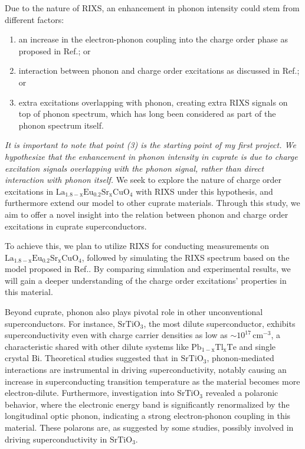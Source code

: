 \documentclass[11pt]{article}
\begin{document}
Due to the nature of RIXS, an enhancement in phonon intensity could stem from different factors: 
\begin{enumerate}
  \item an increase in the electron-phonon coupling into the charge order phase as proposed in Ref.\cite{wang_charge_2021,peng_electronic_2022}; or
  \item interaction between phonon and charge order excitations as discussed in Ref.\cite{li_multiorbital_2020, chaix_dispersive_2017,huang_quantum_2021}; or 
  \item extra excitations overlapping with phonon, creating extra RIXS signals on top of phonon spectrum, which has long been considered as part of the phonon spectrum itself. 
\end{enumerate}
\textit{It is important to note that point (3) is the starting point of my first project. We hypothesize that the enhancement in phonon intensity in cuprate is due to charge excitation signals overlapping with the phonon signal, rather than direct interaction with phonon itself.}  We seek to explore the nature of charge order excitations in $\mathrm{La_{1.8-x}Eu_{0.2}Sr_xCuO_{4}}$ with RIXS under this hypothesis, and furthermore extend our model to other cuprate materials. Through this study, we aim to offer a novel insight into the relation between phonon and charge order excitations in cuprate superconductors. 

To achieve this, we plan to utilize RIXS for conducting measurements on $\mathrm{La_{1.8-x}Eu_{0.2}Sr_xCuO_{4}}$, followed by simulating the RIXS spectrum based on the model proposed in Ref.\cite{devereaux_directly_2016}. By comparing simulation and experimental results, we will gain a deeper understanding of the charge order excitations' properties in this material. 

Beyond cuprate, phonon also plays pivotal role in other unconventional superconductors. For instance, $\mathrm{SrTiO_{3}}$, the most dilute superconductor, exhibits superconductivity even with charge carrier densities as low as $\sim 10^{17}\,\mathrm{cm^{-3}}$\cite{schooley_superconductivity_1964,lin_fermi_2013}, a characteristic shared with other dilute systems like $\mathrm{Pb_{1-x}Tl_{x}Te}$\cite{known} and single crystal $\mathrm{Bi}$\cite{prakash_evidence_2017}. Theoretical studies suggested that in $\mathrm{SrTiO_{3}}$, phonon-mediated interactions are instrumental in driving superconductivity, notably causing an increase in superconducting transition temperature as the material becomes more electron-dilute\cite{gastiasoro_phonon-mediated_2019}. Furthermore, investigation into $\mathrm{SrTiO_{3}}$ revealed a polaronic behavior, where the electronic energy band is significantly renormalized by the longitudinal optic phonon, indicating a strong electron-phonon coupling in this material\cite{swartz_polaronic_2018}. These polarons are, as suggested by some studies\cite{}, possibly involved in driving superconductivity in $\mathrm{SrTiO_{3}}$.
\end{document}
